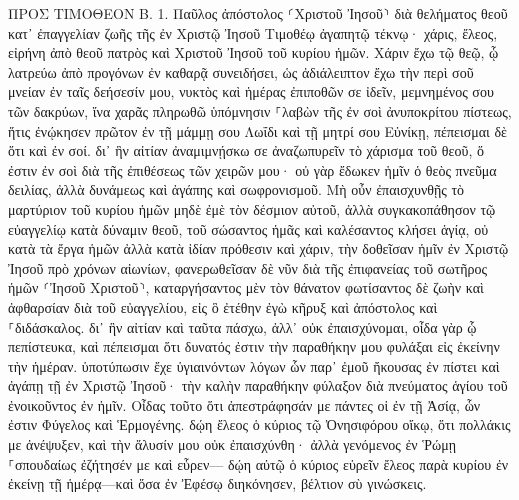 \documentclass[twoside, 9pt]{extreport}
\begin{document}
ΠΡΟΣ ΤΙΜΟΘΕΟΝ Β.
1.
Παῦλος ἀπόστολος ⸂Χριστοῦ Ἰησοῦ⸃ διὰ θελήματος θεοῦ κατ᾽ ἐπαγγελίαν ζωῆς τῆς ἐν Χριστῷ Ἰησοῦ 
Τιμοθέῳ ἀγαπητῷ τέκνῳ· χάρις, ἔλεος, εἰρήνη ἀπὸ θεοῦ πατρὸς καὶ Χριστοῦ Ἰησοῦ τοῦ κυρίου ἡμῶν. 
Χάριν ἔχω τῷ θεῷ, ᾧ λατρεύω ἀπὸ προγόνων ἐν καθαρᾷ συνειδήσει, ὡς ἀδιάλειπτον ἔχω τὴν περὶ σοῦ μνείαν ἐν ταῖς δεήσεσίν μου, νυκτὸς καὶ ἡμέρας 
ἐπιποθῶν σε ἰδεῖν, μεμνημένος σου τῶν δακρύων, ἵνα χαρᾶς πληρωθῶ 
ὑπόμνησιν ⸀λαβὼν τῆς ἐν σοὶ ἀνυποκρίτου πίστεως, ἥτις ἐνῴκησεν πρῶτον ἐν τῇ μάμμῃ σου Λωΐδι καὶ τῇ μητρί σου Εὐνίκῃ, πέπεισμαι δὲ ὅτι καὶ ἐν σοί. 
δι᾽ ἣν αἰτίαν ἀναμιμνῄσκω σε ἀναζωπυρεῖν τὸ χάρισμα τοῦ θεοῦ, ὅ ἐστιν ἐν σοὶ διὰ τῆς ἐπιθέσεως τῶν χειρῶν μου· 
οὐ γὰρ ἔδωκεν ἡμῖν ὁ θεὸς πνεῦμα δειλίας, ἀλλὰ δυνάμεως καὶ ἀγάπης καὶ σωφρονισμοῦ. 
Μὴ οὖν ἐπαισχυνθῇς τὸ μαρτύριον τοῦ κυρίου ἡμῶν μηδὲ ἐμὲ τὸν δέσμιον αὐτοῦ, ἀλλὰ συγκακοπάθησον τῷ εὐαγγελίῳ κατὰ δύναμιν θεοῦ, 
τοῦ σώσαντος ἡμᾶς καὶ καλέσαντος κλήσει ἁγίᾳ, οὐ κατὰ τὰ ἔργα ἡμῶν ἀλλὰ κατὰ ἰδίαν πρόθεσιν καὶ χάριν, τὴν δοθεῖσαν ἡμῖν ἐν Χριστῷ Ἰησοῦ πρὸ χρόνων αἰωνίων, 
φανερωθεῖσαν δὲ νῦν διὰ τῆς ἐπιφανείας τοῦ σωτῆρος ἡμῶν ⸂Ἰησοῦ Χριστοῦ⸃, καταργήσαντος μὲν τὸν θάνατον φωτίσαντος δὲ ζωὴν καὶ ἀφθαρσίαν διὰ τοῦ εὐαγγελίου, 
εἰς ὃ ἐτέθην ἐγὼ κῆρυξ καὶ ἀπόστολος καὶ ⸀διδάσκαλος. 
δι᾽ ἣν αἰτίαν καὶ ταῦτα πάσχω, ἀλλ᾽ οὐκ ἐπαισχύνομαι, οἶδα γὰρ ᾧ πεπίστευκα, καὶ πέπεισμαι ὅτι δυνατός ἐστιν τὴν παραθήκην μου φυλάξαι εἰς ἐκείνην τὴν ἡμέραν. 
ὑποτύπωσιν ἔχε ὑγιαινόντων λόγων ὧν παρ᾽ ἐμοῦ ἤκουσας ἐν πίστει καὶ ἀγάπῃ τῇ ἐν Χριστῷ Ἰησοῦ· 
τὴν καλὴν παραθήκην φύλαξον διὰ πνεύματος ἁγίου τοῦ ἐνοικοῦντος ἐν ἡμῖν. 
Οἶδας τοῦτο ὅτι ἀπεστράφησάν με πάντες οἱ ἐν τῇ Ἀσίᾳ, ὧν ἐστιν Φύγελος καὶ Ἑρμογένης. 
δῴη ἔλεος ὁ κύριος τῷ Ὀνησιφόρου οἴκῳ, ὅτι πολλάκις με ἀνέψυξεν, καὶ τὴν ἅλυσίν μου οὐκ ἐπαισχύνθη· 
ἀλλὰ γενόμενος ἐν Ῥώμῃ ⸀σπουδαίως ἐζήτησέν με καὶ εὗρεν— 
δῴη αὐτῷ ὁ κύριος εὑρεῖν ἔλεος παρὰ κυρίου ἐν ἐκείνῃ τῇ ἡμέρᾳ—καὶ ὅσα ἐν Ἐφέσῳ διηκόνησεν, βέλτιον σὺ γινώσκεις. 
\end{document}
